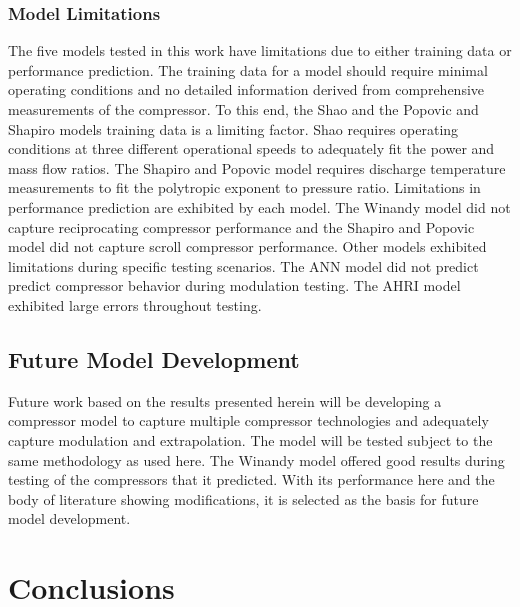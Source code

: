 \documentclass[preprint,11pt,authoryear]{elsarticle}
\begin{document}
\subsubsection{Model Limitations}

The five models tested in this work have limitations due to either training data or performance prediction. The training data for a model should require minimal operating conditions and no detailed information derived from comprehensive measurements of the compressor. To this end, the Shao and the Popovic and Shapiro models training data is a limiting factor. Shao requires operating conditions at three different operational speeds to adequately fit the power and mass flow ratios. The Shapiro and Popovic model requires discharge temperature measurements to fit the polytropic exponent to pressure ratio. Limitations in performance prediction are exhibited by each model. The Winandy model did not capture reciprocating compressor performance and the Shapiro and Popovic model did not capture scroll compressor performance. Other models exhibited limitations during specific testing scenarios. The ANN model did not predict predict compressor behavior during modulation testing. The AHRI model exhibited large errors throughout testing. 

\subsection{Future Model Development}

Future work based on the results presented herein will be developing a compressor model to capture multiple compressor technologies and adequately capture modulation and extrapolation. The model will be tested subject to the same methodology as used here. The Winandy model offered good results during testing of the compressors that it predicted. With its performance here and the body of literature showing modifications, it is selected as the basis for future model development.


\section{Conclusions}
\end{document}

